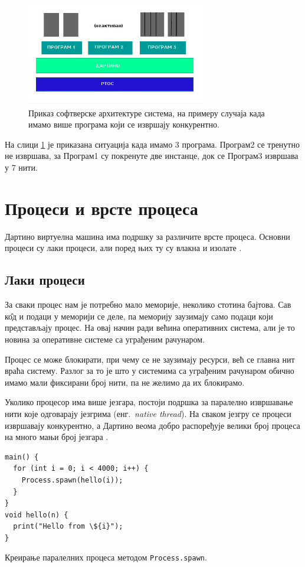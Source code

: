 \documentclass[12pt,oneside]{memoir}
\begin{document}
\begin{figure}[!ht]
  \centering
  \includegraphics[width=0.7\textwidth]{arhitektura.jpg}
  \caption{Приказ софтверске архитектуре система, на примеру случаја када имамо више програма који се извршају конкурентно.}
  \label{fig:model}
\end{figure}
На слици \ref{fig:model} је приказана ситуација када имамо 3 програма. Програм2 се тренутно не извршава, за Програм1 су покренуте две инстанце, док се Програм3  извршава у 7 нити.

\section{Процеси и врсте процеса}
\label{procesi}
Дартино виртуелна машина има подршку за различите врсте процеса. Основни процеси су лаки процеси, али поред њих ту су влакна и изолате \cite{Dartino, procesi_i_izolate, korutine_i_vlakna}.
\subsection{Лаки процеси}
\label{laki_procesi}
За сваки процес нам је потребно мало меморије, неколико стотина бајтова. Сав к\^{о}д и подаци у меморији се деле, па меморију заузимају само подаци који представљају процес. На овај начин ради већина оперативних система, али је то новина за оперативне системе са уграђеним рачунаром.

Процес се може блокирати, при чему се не заузимају ресурси, већ се главна нит враћа систему. Разлог за то је што у системима са уграђеним рачунаром обично имамо мали фиксирани број нити, па не желимо да их блокирамо. 

Уколико процесор има више језгара, постоји подршка за паралелно извршавање нити које одговарају језгрима (енг.~\textit{native thread}). На сваком језгру се процеси извршавају конкурентно, а Дартино веома добро распоређује велики број процеса на много мањи број језгара \cite{Dartino}.

\begin{listing}
\begin{verbatim}
main() {
  for (int i = 0; i < 4000; i++) {
    Process.spawn(hello(i));
  }
}
void hello(n) {
  print("Hello from \${i}");
}
\end{verbatim}
\caption{Креирање паралелних процеса методом \texttt{Process.spawn}.}
\label{paralelniprocesi}
\end{listing}
\end{document}
